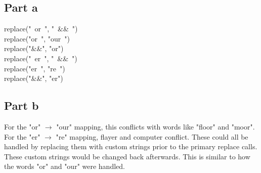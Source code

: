 \documentclass{article}%
\begin{document}
\subsection{Part a}
replace("{\ }or{\ }", "{\ }\&\&{\ }") \\
replace("or{\ }", "our{\ }") \\
replace("\&\&", "or") \\

\noindent replace("{\ }er{\ }", "{\ }\&\&{\ }") \\
replace("er{\ }", "re{\ }") \\
replace("\&\&", "er") \\

\subsection{Part b}
For the "or" $\rightarrow$ "our" mapping, this conflicts with words like "floor" and "moor". For the "er" $\rightarrow$ "re"
mapping, flayer and computer conflict. These could all be handled by replacing them with custom strings prior to the primary
replace calls. These custom strings would be changed back afterwards. This is similar to how the words "or" and "our" were handled.
\end{document}
